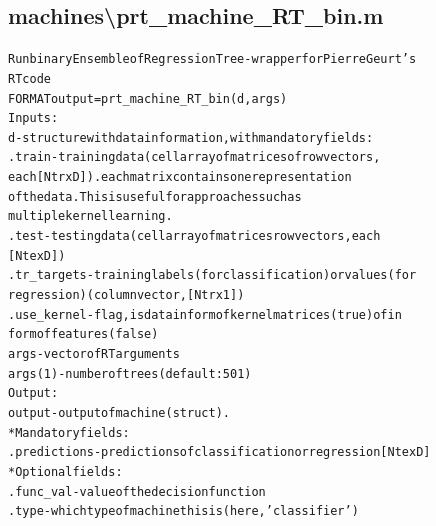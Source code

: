 \subsection{machines\textbackslash prt\_machine\_RT\_bin.m}
\begin{alltt}

 Run binary Ensemble of Regression Tree - wrapper for Pierre Geurt's
 RT code
 FORMAT output =  prt\_machine\_RT\_bin(d,args)
 Inputs:
   d         - structure with data information, with mandatory fields:
     .train      - training data (cell array of matrices of row vectors,
                   each [Ntr x D]). each matrix contains one representation
                   of the data. This is useful for approaches such as
                   multiple kernel learning.
     .test       - testing data  (cell array of matrices row vectors, each
                   [Nte x D])
     .tr\_targets - training labels (for classification) or values (for
                   regression) (column vector, [Ntr x 1])
     .use\_kernel - flag, is data in form of kernel matrices (true) of in 
                form of features (false)
    args    - vector of RT arguments
       args(1) - number of trees (default: 501)
 Output:
    output  - output of machine (struct).
     * Mandatory fields:
      .predictions - predictions of classification or regression [Nte x D]
     * Optional fields:
      .func\_val - value of the decision function
      .type     - which type of machine this is (here, 'classifier')
\end{alltt}


